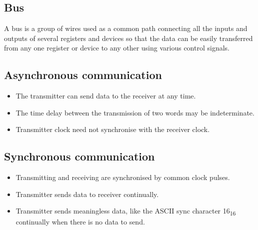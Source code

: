 \documentclass[11pt]{article}
\begin{document}
\subsection{Bus}
\label{sec:orgf972035}
A bus is a group of wires used as a common path connecting all the inputs and outputs of several registers and devices so that the data can be easily transferred from any one register or device to any other using various control signals.

\subsection{Asynchronous communication}
\label{sec:org7b3d31c}
\begin{itemize}
\item The transmitter can send data to the receiver at any time.
\item The time delay between the transmission of two words may be indeterminate.
\item Transmitter clock need not synchronise with the receiver clock.
\end{itemize}

 \newpage

\subsection{Synchronous communication}
\label{sec:org2020f0e}
\begin{itemize}
\item Transmitting and receiving are synchronised by common clock pulses.
\item Transmitter sends data to receiver continually.
\item Transmitter sends meaningless data, like the ASCII sync character 16\textsubscript{16} continually when there is no data to send.
\end{itemize}
\end{document}
